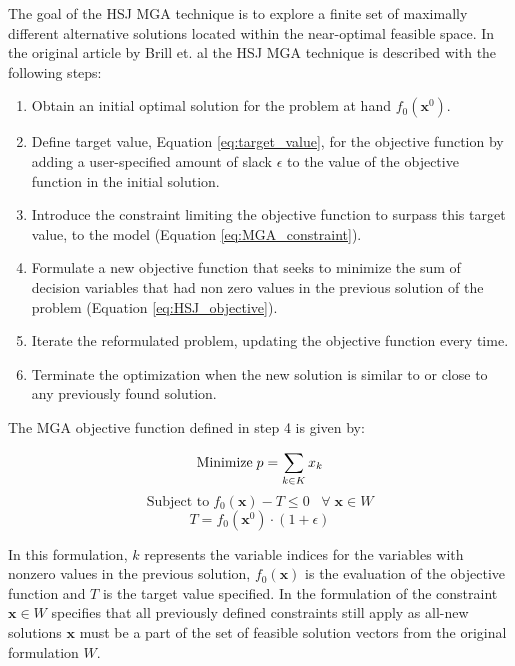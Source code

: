 The goal of the HSJ MGA technique is to explore a finite set of maximally different alternative solutions located within the near-optimal feasible space. In the original article by Brill et. al \cite{Brill_MGA_1982} the HSJ MGA technique is described with the following steps:

\begin{enumerate}
	\item Obtain an initial optimal solution for the problem at hand $f_0(\mathbf{x}^0)$. 
	\item Define target value, Equation \ref{eq:target_value}, for the objective function by adding a user-specified amount of slack  $ \epsilon $ to the value of the objective function in the initial solution. 
	\item Introduce the constraint limiting the objective function to surpass this target value, to the model (Equation \ref{eq:MGA_constraint}).
	\item Formulate a new objective function that seeks to minimize the sum of decision variables that had non zero values in the previous solution of the problem (Equation \ref{eq:HSJ_objective}). 
	\item Iterate the reformulated problem, updating the objective function every time. 
	\item Terminate the optimization when the new solution is similar to or close to any previously found solution. 
\end{enumerate}


The MGA objective function defined in step 4 is given by:

\begin{equation}\label{eq:HSJ_objective}
\text{Minimize} \;  p = \sum_{k \in K} x_k \\
\end{equation}
\begin{equation}\label{eq:MGA_constraint}
\text{Subject to} \;  f_0(\mathbf{x}) - T \leq 0 \; \; \; \forall \;  \mathbf{x}\in W
\end{equation}
\begin{equation}\label{eq:target_value}
T =  f_0(\mathbf{x}^0) \cdot (1+\epsilon)
\end{equation}

In this formulation, $k$ represents the variable indices for the variables with nonzero values in the previous solution, $f_0(\mathbf{x})$ is the evaluation of the objective function and $T$ is the target value specified. In the formulation of the constraint $\mathbf{x}\in W$ specifies that all previously defined constraints still apply as all-new solutions $\mathbf{x}$ must be a part of the set of feasible solution vectors from the original formulation $W$.


